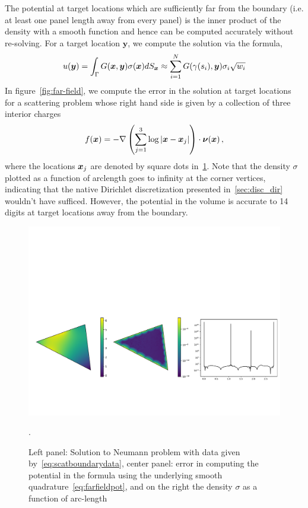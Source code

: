 The potential at target locations which are sufficiently far from the boundary (i.e. at least one panel length away from 
every panel) is the inner product of the 
density with a smooth function and hence can be computed accurately without re-solving. For a target 
location $\boldsymbol{y}$, we compute the solution via the formula,
\begin{equation}
\label{eq:farfieldpot}
u(\boldsymbol{y}) = \int_{\Gamma} G(\boldsymbol{x},\boldsymbol{y}) \sigma(\boldsymbol{x}) dS_{\boldsymbol{x}} \approx \sum_{i=1}^{N}  G(\gamma(s_{i}),\boldsymbol{y}) \sigma_{i} \sqrt{w_{i}}
\end{equation}
In figure~\cref{fig:far-field}, we compute the error in the solution at target
locations for a scattering problem whose right hand side is given by a collection of three interior charges
\begin{equation}
\label{eq:scatboundarydata}
f(\boldsymbol{x}) = -\nabla  \left(\sum_{j=1}^{3} \log |\boldsymbol{x} - \boldsymbol{x}_{j}|  \right)  \cdot \boldsymbol{\nu}(\boldsymbol{x})\, ,  
\end{equation}
where the locations $\boldsymbol{x}_{j}$ are denoted by square dots in~\cref{fig:scatteringtest}. Note that the density $\sigma$ plotted
as a function of arclength goes to infinity at the corner vertices, indicating that the native Dirichlet discretization 
presented in~\cref{sec:disc_dir} wouldn't have sufficed. However, the potential in the volume is accurate to 14 digits at
target locations away from the boundary. 
\begin{figure}
\begin{center}
\includegraphics[width=\linewidth]{media/weaktest}
\caption{Left panel: Solution to Neumann problem with data given by~\cref{eq:scatboundarydata}, center panel: error in computing the potential in the formula using the underlying smooth quadrature~\cref{eq:farfieldpot}, and on the right the density $\sigma$ as a function of arc-length}.
\end{center}
\label{fig:scatteringtest}
\end{figure}


